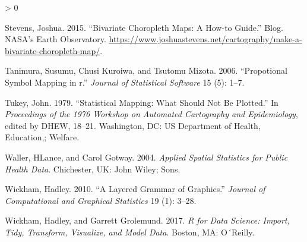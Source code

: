 \documentclass[
]{book}
\newlength{\cslhangindent}
\newenvironment{CSLReferences}[2] %
 {%
  \setlength{\parindent}{0pt}
  \ifodd #1 \everypar{\setlength{\hangindent}{\cslhangindent}}\ignorespaces\fi
  \ifnum #2 > 0
  \setlength{\parskip}{#2\baselineskip}
  \fi
 }%
 {}
\begin{document}
\begin{CSLReferences}{1}{0}
\leavevmode\hypertarget{ref-Stevens_2015}{}%
Stevens, Joshua. 2015. {``Bivariate Choropleth Maps: A How-to Guide.''} Blog. NASA's Earth Observatory. \url{https://www.joshuastevens.net/cartography/make-a-bivariate-choropleth-map/}.

\leavevmode\hypertarget{ref-Tanimura_2006}{}%
Tanimura, Susumu, Chusi Kuroiwa, and Tsutomu Mizota. 2006. {``Propotional Symbol Mapping in r.''} \emph{Journal of Statistical Software} 15 (5): 1--7.

\leavevmode\hypertarget{ref-Tukey_1979}{}%
Tukey, John. 1979. {``Statistical Mapping: What Should Not Be Plotted.''} In \emph{Proceedings of the 1976 Workshop on Automated Cartography and Epidemiology}, edited by DHEW, 18--21. Washington, DC: US Department of Health, Education,; Welfare.

\leavevmode\hypertarget{ref-Waller_2004}{}%
Waller, HLance, and Carol Gotway. 2004. \emph{Applied Spatial Statistics for Public Health Data}. Chichester, UK: John Wiley; Sons.

\leavevmode\hypertarget{ref-Wickham_2010}{}%
Wickham, Hadley. 2010. {``A Layered Grammar of Graphics.''} \emph{Journal of Computational and Graphical Statistics} 19 (1): 3--28.

\leavevmode\hypertarget{ref-Wickham_2017}{}%
Wickham, Hadley, and Garrett Grolemund. 2017. \emph{R for Data Science: Import, Tidy, Transform, Visualize, and Model Data}. Boston, MA: O´Reilly.

\end{CSLReferences}
\end{document}
